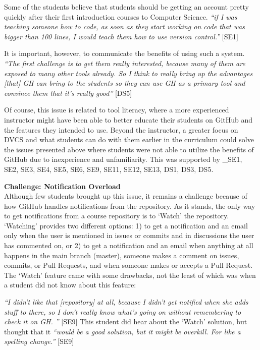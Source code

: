 Some of the students believe that students should be getting an account pretty quickly after their first introduction courses to Computer Science. \textit{``if I was teaching someone how to code, as soon as they start working on code that was bigger than 100 lines, I would teach them how to use version control.''} [SE1]


It is important, however, to communicate the benefits of using such a system. \textit{``The first challenge is to get them really interested, because many of them are exposed to many other tools already. So I think to really bring up the advantages [that] GH can bring to the students so they can use GH as a primary tool and convince them that it's really good''} [DS5]

Of course, this issue is related to tool literacy, where a more experienced instructor might have been able to better educate their students on GitHub and the features they intended to use. Beyond the instructor, a greater focus on DVCS and what students can do with them earlier in the curriculum could solve the issues presented above where students were not able to utilize the benefits of GitHub due to inexperience and unfamiliarity. This was supported by _{SE1, SE2, SE3, SE4, SE5, SE6, SE9, SE11, SE12, SE13, DS1, DS3, DS5}.

\textbf{Challenge: Notification Overload} \\
Although few students brought up this issue, it remains a challenge because of how GitHub handles notifications from the repository. As it stands, the only way to get notifications from a course repository is to `Watch' the repository. `Watching' provides two different options: 1) to get a notification and an email only when the user is mentioned in issues or commits and in discussions the user has commented on, or 2) to get a notification and an email when anything at all happens in the main branch (master), someone makes a comment on issues, commits, or Pull Requests, and when someone makes or accepts a Pull Request. The `Watch' feature came with some drawbacks, not the least of which was when a student did not know about this feature:

\textit{``I didn't like that [repository] at all, because I didn't get notified when she adds stuff to there, so I don't really know what's going on without remembering to check it on GH. ''} [SE9] This student did hear about the `Watch' solution, but thought that it \textit{``would be a good solution, but it might be overkill. For like a spelling change.''} [SE9]

